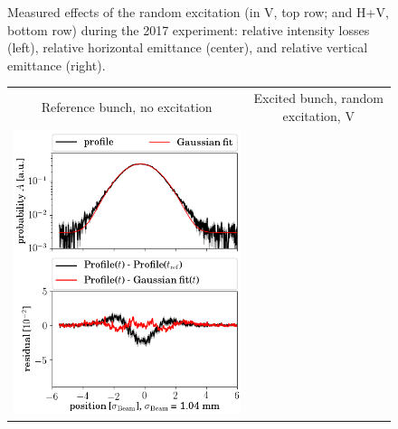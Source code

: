 \documentclass[aps
,prstab
,reprint
,longbibliography
,preprintnumbers
,showkeys
,amsfonts,amssymb,amsmath
,floatfix
]{revtex4-1}
\newlength{\bsrtwidth}
\begin{document}
\begin{figure}
\begin{tabular}{ccc}
  \end{tabular}
  \caption{Measured effects of the random excitation (in V, top row;
    and H+V, bottom row) during the 2017 experiment: relative
    intensity losses (left), relative horizontal emittance (center),
    and relative vertical emittance (right).}
  \label{fig:ranexp}
\end{figure}


\begin{figure}
  \begin{tabular}{cc}
    Reference bunch, no excitation & Excited bunch, random excitation, V \\
    \includegraphics[width=\bsrtwidth]{profile_v_ranv_slot_1698.png} &

\end{tabular}
\end{figure}
\end{document}
